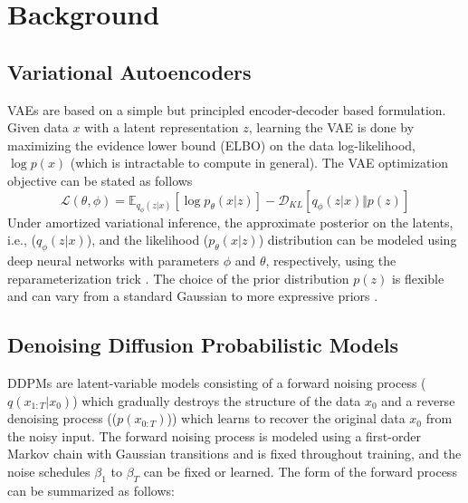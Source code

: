 \documentclass[10pt]{article} \usepackage[accepted]{tmlr}
\begin{document}
\section{Background}
\label{sec:background}

\subsection{Variational Autoencoders}

\label{subsec:bg_vae}
VAEs \citep{kingma2014autoencoding, rezende2016variational} are based on a simple but principled encoder-decoder based formulation. Given data $x$ with a latent representation $z$, learning the VAE is done by maximizing the evidence lower bound (ELBO) on the data log-likelihood, $\log{p(x)}$ (which is intractable to compute in general). The VAE optimization objective can be stated as follows
\begin{equation}
    \mathcal{L(\theta, \phi)} = \mathbb{E}_{q_{\phi}(z|x)}[\log{p_{\theta}(x|z)}] - \mathcal{D}_{KL}[q_{\phi}(z|x) \Vert p(z)]
\end{equation}
Under amortized variational inference, the approximate posterior on the latents, i.e., ($q_{\phi}(z|x)$),  and the likelihood ($p_{\theta}(x|z)$)  distribution can be modeled using deep neural networks with parameters $\phi$ and $\theta$, respectively, using the reparameterization trick \citep{kingma2014autoencoding, rezende2016variational}. The choice of the prior distribution $p(z)$ is flexible and can vary from a standard Gaussian \citep{kingma2014autoencoding} to more expressive priors \citep{berg2019sylvester, grathwohl2018ffjord, kingma2017improving}.

\subsection{Denoising Diffusion Probabilistic Models}

DDPMs \citep{sohldickstein2015deep, ho2020denoising} are latent-variable models consisting of a forward noising process ($q(x_{1:T}|x_0)$) which gradually destroys the structure of the data $x_0$ and a reverse denoising process (($p(x_{0:T})$)) which learns to recover the original data $x_0$ from the noisy input. The forward noising process is modeled using a first-order Markov chain with Gaussian transitions and is fixed throughout training, and the noise schedules $\beta_1$ to $\beta_T$ can be fixed or learned. The form of the forward process can be summarized as follows:
\end{document}
